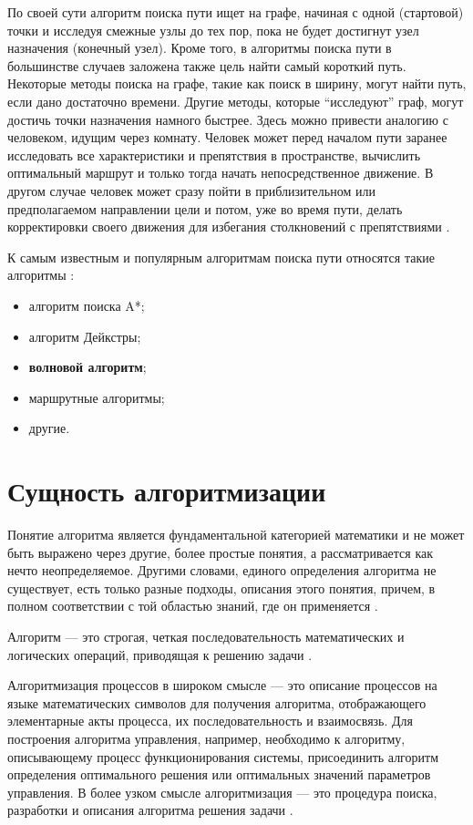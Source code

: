 По своей сути алгоритм поиска пути ищет на графе, начиная с одной (стартовой) точки и исследуя смежные узлы до тех пор, пока не будет достигнут узел назначения (конечный узел). Кроме того, в алгоритмы поиска пути в большинстве случаев заложена также цель найти самый короткий путь. Некоторые методы поиска на графе, такие как поиск в ширину, могут найти путь, если дано достаточно времени. Другие методы, которые ``исследуют'' граф, могут достичь точки назначения намного быстрее. Здесь можно привести аналогию с человеком, идущим через комнату. Человек может перед началом пути заранее исследовать все характеристики и препятствия в пространстве, вычислить оптимальный маршрут и только тогда начать непосредственное движение. В другом случае человек может сразу пойти в приблизительном или предполагаемом направлении цели и потом, уже во время пути, делать корректировки своего движения для избегания столкновений с препятствиями \cite{wiki:pathfinding}.

К самым известным и популярным алгоритмам поиска пути относятся такие алгоритмы \cite{wiki:pathfinding}:

\begin{itemize}
    \item алгоритм поиска A*;
    \item алгоритм Дейкстры;
    \item \textbf{волновой алгоритм};
    \item маршрутные алгоритмы;
    \item другие.
\end{itemize}

\section{Сущность алгоритмизации}

Понятие алгоритма является фундаментальной категорией математики и не может быть выражено через другие, более простые понятия, а рассматривается как нечто неопределяемое. Другими словами, единого определения алгоритма не существует, есть только разные подходы, описания этого понятия, причем, в полном соответствии с той областью знаний, где он применяется \cite{comp:algoritm}.

Алгоритм --- это строгая, четкая последовательность математических и логических операций, приводящая к решению задачи \cite{comp:algoritm}.

Алгоритмизация процессов в широком смысле --- это описание процессов на языке математических символов для получения алгоритма, отображающего элементарные акты процесса, их последовательность и взаимосвязь. Для построения алгоритма управления, например, необходимо к алгоритму, описывающему процесс функционирования системы, присоединить алгоритм определения оптимального решения или оптимальных значений параметров управления. В более узком смысле алгоритмизация --- это процедура поиска, разработки и описания алгоритма решения задачи \cite{comp:algoritm}.

